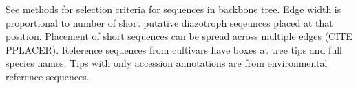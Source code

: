 See methods for selection criteria for sequences in backbone tree. Edge width is proportional to number of short putative diazotroph seqeunces placed at that position. Placement of short sequences can be spread across multiple edges (CITE PPLACER). Reference sequences from cultivars have boxes at tree tips and full species names. Tips with only accession annotations are from environmental reference sequences.